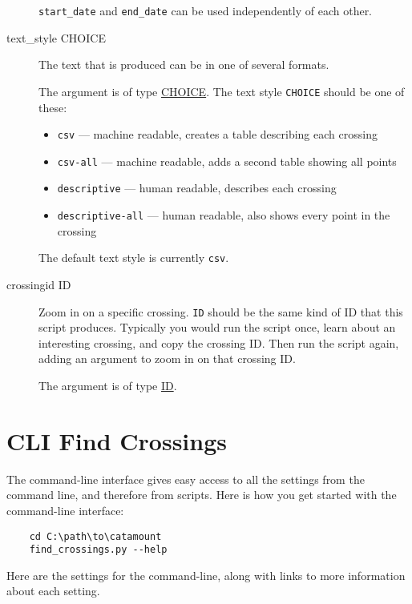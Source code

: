 \begin{description}
\verb=start_date= and \verb=end_date= can be used independently of
each other.

\item[text\_style CHOICE]
\hypertarget{crossing-text-style}{}

The text that is produced can be in one of several formats.

The argument is of type \hyperlink{argument-type-choice}{CHOICE}. The text
style \verb=CHOICE= should be one of these:

\begin{itemize}
\item \verb=csv= --- machine readable, creates a table describing each crossing
\item \verb=csv-all= --- machine readable, adds a second table showing all points
\item \verb=descriptive= --- human readable, describes each crossing
\item \verb=descriptive-all= --- human readable, also shows every point in the crossing
\end{itemize}

The default text style is currently \verb=csv=.

\item[crossingid ID]
\hypertarget{crossing-crossingid}{}

Zoom in on a specific crossing. \verb=ID= should be the same kind of
ID that this script produces. Typically you would run the script once, learn
about an interesting crossing, and copy the crossing ID. Then run the script
again, adding an argument to zoom in on that crossing ID.

The argument is of type \hyperlink{argument-type-id}{ID}.

\end{description}


\section{CLI Find Crossings}

The command-line interface gives easy access to all the settings from the
command line, and therefore from scripts. Here is how you get started with
the command-line interface:

\begin{verbatim}
    cd C:\path\to\catamount
    find_crossings.py --help
\end{verbatim}

Here are the settings for the command-line, along with links to
more information about each setting.

